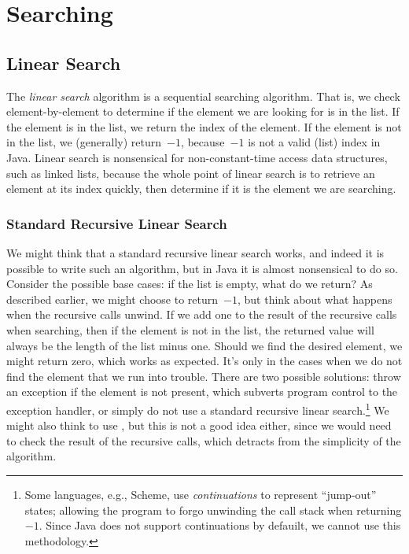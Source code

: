\section{Searching}

\subsection{Linear Search}
The \emph{linear search} algorithm is a sequential searching algorithm. 
That is, we check element-by-element to determine if the element we are looking for is in the list. 
If the element is in the list, we return the index of the element. 
If the element is not in the list, we (generally) return~$-1$, because~$-1$ is not a valid (list) index in Java. 
Linear search is nonsensical for non-constant-time access data structures, such as linked lists, because the whole point of linear search is to retrieve an element at its index quickly, then determine if it is the element we are searching. 

\subsubsection*{Standard Recursive Linear Search}
We might think that a standard recursive linear search works, and indeed it is possible to write such an algorithm, but in Java it is almost nonsensical to do so. 
Consider the possible base cases: if the list is empty, what do we return? 
As described earlier, we might choose to return~$-1$, but think about what happens when the recursive calls unwind. 
If we add one to the result of the recursive calls when searching, then if the element is not in the list, the returned value will always be the length of the list minus one. 
Should we find the desired element, we might return zero, which works as expected. 
It's only in the cases when we do not find the element that we run into trouble. There are two possible solutions: throw an exception if the element is not present, which subverts program control to the exception handler, or simply do not use a standard recursive linear search.\footnote{Some languages, e.g., Scheme, use \emph{continuations} to represent ``jump-out'' states; allowing the program to forgo unwinding the call stack when returning $-1$. Since Java does not support continuations by defauilt, we cannot use this methodology.} 
We might also think to use , but this is not a good idea either, since we would need to check the result of the recursive calls, which detracts from the simplicity of the algorithm.

